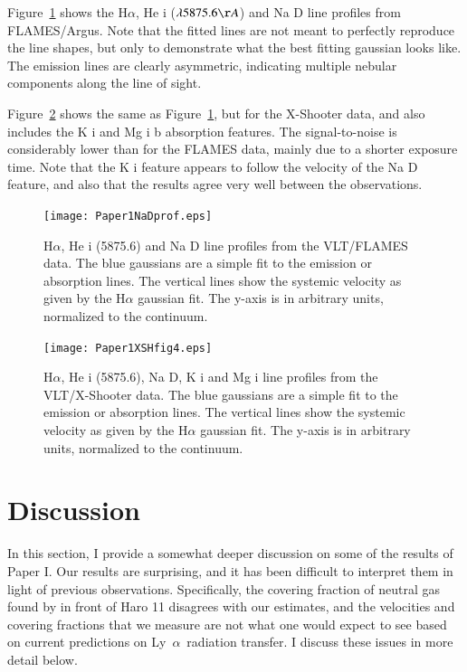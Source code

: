 \documentclass[a4wide,12pt]{book}
\newcommand{\ha}{H${\alpha}$}
\newcommand{\lya}{Ly~${\alpha}$}
\begin{document}
{Figure~\ref{Fig:Argus_lines} shows the \ha , He {\sc i} ($\lambda 5875.6 \AA$) and Na D line profiles from FLAMES/Argus. Note that the fitted lines are not meant to perfectly reproduce the line shapes, but only to demonstrate what the best fitting gaussian looks like. The emission lines are clearly asymmetric, indicating multiple nebular components along the line of sight. 

Figure~\ref{Fig_XSHLines} shows the same as Figure~\ref{Fig:Argus_lines}, but for the X-Shooter data, and also includes the K {\sc i} and Mg {\sc i} b absorption features. The signal-to-noise is considerably lower than for the FLAMES data, mainly due to a shorter exposure time. Note that the K {\sc i} feature appears to follow the velocity of the Na D feature, and also that the results agree very well between the observations. 

\begin{figure}
   \centering
   \texttt{[image: Paper1NaDprof.eps]}
   \caption{H$\alpha$, He {\sc i} (5875.6) and Na D line profiles from the VLT/FLAMES data. The blue gaussians are a simple fit to the emission or absorption lines. The vertical lines show the systemic velocity as given by the H$\alpha$ gaussian fit. The y-axis is in arbitrary units, normalized to the continuum.}
              \label{Fig:Argus_lines}
    \end{figure}




   \begin{figure}
   \centering
   \texttt{[image: Paper1XSHfig4.eps]}
   \caption{H$\alpha$, He {\sc i} (5875.6), Na D, K {\sc i} and Mg {\sc i} line profiles from the VLT/X-Shooter data. The blue gaussians are a simple fit to the emission or absorption lines. The vertical lines show the systemic velocity as given by the H$\alpha$ gaussian fit. The y-axis is in arbitrary units, normalized to the continuum. }
              \label{Fig_XSHLines}
    \end{figure}

\chapter{Discussion}

In this section, I provide a somewhat deeper discussion on some of the results of Paper I. Our results are surprising, and it has been difficult to interpret them in light of previous observations. Specifically, the covering fraction of neutral gas found by \citet{kunth-1998} in front of Haro 11 disagrees with our estimates, and the velocities and covering fractions that we measure are not what one would expect to see based on current predictions on \lya\ radiation transfer. I discuss these issues in more detail below.

}
\end{document}

